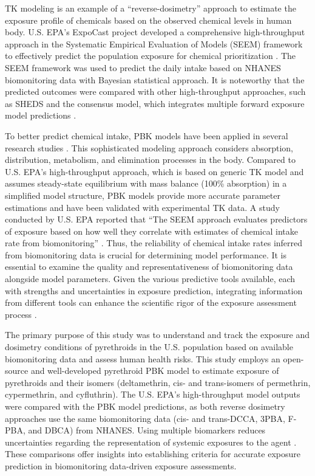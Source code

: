 \documentclass[toxics,article,submit,pdftex,moreauthors]{Definitions/mdpi}
\begin{document}
TK modeling is an example of a ``reverse-dosimetry'' approach to
estimate the exposure profile of chemicals
\citep{egeghy2011assessment, lin2023reconstructing} based on the
observed chemical levels in human body. U.S. EPA's ExpoCast
project developed a comprehensive high-throughput approach in the
Systematic Empirical Evaluation of Models (SEEM) framework to
effectively predict the population exposure for chemical prioritization
\citep{wambaugh2013high, stanfield2022bayesian}. The SEEM framework was
used to predict the daily intake based on NHANES biomonitoring data with
Bayesian statistical approach. 
It is noteworthy that the predicted outcomes were compared with other high-throughput
approaches, such as SHEDS \citep{isaacs2014sheds} and the consensus
model, which integrates multiple forward exposure model predictions
\citep{ring2018consensus}.

To better predict chemical intake, PBK models
have been applied in several research studies \citep{tan2006use, allen2007use,
lyons2008computational, tornero2012pharmacokinetic, moreau2017using}. This
sophisticated modeling approach considers absorption, distribution, metabolism,
and elimination processes in the body. Compared to U.S. EPA's
high-throughput approach, which is based on generic TK model and assumes
steady-state equilibrium with mass balance (100\% absorption) in a simplified
model structure, PBK models provide more accurate parameter estimations and
have been validated with experimental TK data. A study conducted by U.S.
EPA reported that ``The SEEM approach evaluates predictors of exposure based on
how well they correlate with estimates of chemical intake rate from
biomonitoring'' \citep{ring2018consensus}. Thus, the reliability of chemical
intake rates inferred from biomonitoring data is crucial for determining model
performance. It is essential to examine the quality and
representativeness of biomonitoring data alongside model parameters. Given the various predictive
tools available, each with strengths and uncertainties in exposure prediction,
integrating information from different tools can enhance the scientific
rigor of the exposure assessment process \citep{moreau2017using}.

The primary purpose of this study was to understand and track the
exposure and dosimetry conditions of pyrethroids in the U.S. population
based on available biomonitoring data and assess human health risks.
This study employs an open-source and well-developed pyrethroid PBK
model to estimate exposure of pyrethroids and their isomers
(deltamethrin, cis- and trans-isomers of permethrin, cypermethrin, and
cyfluthrin). The U.S. EPA's high-throughput model outputs were compared
with the PBK model predictions, as both reverse dosimetry approaches use
the same biomonitoring data (cis- and trans-DCCA, 3PBA, F-PBA, and DBCA)
from NHANES. Using multiple biomarkers reduces uncertainties regarding
the representation of systemic exposures to the agent
\citep{lin2023reconstructing}. These comparisons offer insights into
establishing criteria for accurate exposure prediction in biomonitoring
data-driven exposure assessments.
\end{document}
